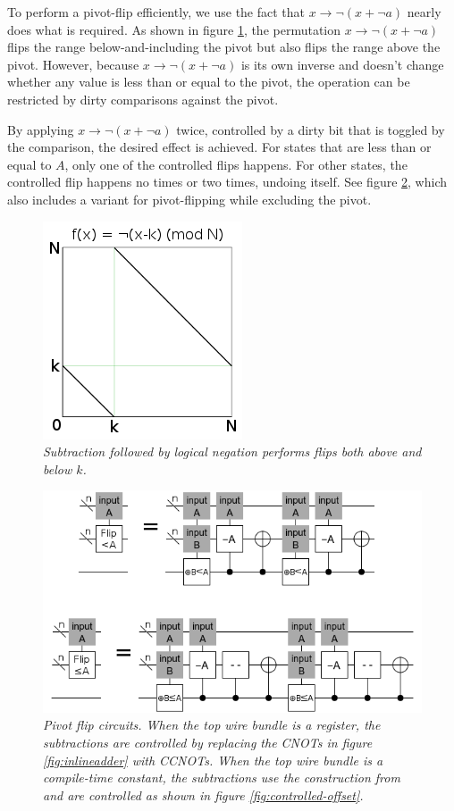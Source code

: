\documentclass[twocolumn]{article}
\begin{document}
To perform a pivot-flip efficiently, we use the fact that $x \rightarrow \lnot(x + \lnot a)$ nearly does what is required.
As shown in figure \ref{fig:double-flip}, the permutation $x \rightarrow \lnot(x + \lnot a)$ flips the range below-and-including the pivot but also flips the range above the pivot.
However, because $x \rightarrow \lnot(x + \lnot a)$ is its own inverse and doesn't change whether any value is less than or equal to the pivot, the operation can be restricted by dirty comparisons against the pivot.

By applying $x \rightarrow \lnot(x + \lnot a)$ twice, controlled by a dirty bit that is toggled by the comparison, the desired effect is achieved.
For states that are less than or equal to $A$, only one of the controlled flips happens.
For other states, the controlled flip happens no times or two times, undoing itself.
See figure \ref{fig:const-pivot-flip}, which also includes a variant for pivot-flipping while excluding the pivot.

\begin{figure}
  \centering
  \includegraphics[totalheight=4cm]{double-flip.png}
  \caption{\em Subtraction followed by logical negation performs flips both above and below $k$.}
  \label{fig:double-flip}
\end{figure}

\begin{figure}
  \centering
  \includegraphics[totalheight=4.5cm]{pivot-flip.png}
  \caption{\em Pivot flip circuits.
  When the top wire bundle is a register, the subtractions are controlled by replacing the CNOTs in figure \ref{fig:inlineadder} with CCNOTs.
  When the top wire bundle is a compile-time constant, the subtractions use the construction from \cite{haner2016} and are controlled as shown in figure \ref{fig:controlled-offset}.}
  \label{fig:const-pivot-flip}
\end{figure}
\end{document}
